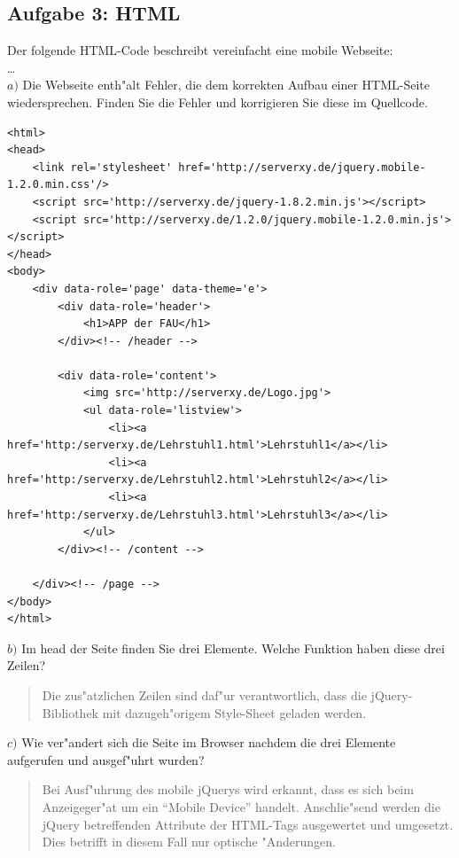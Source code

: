 \subsection{Aufgabe 3: HTML}
Der folgende HTML-Code beschreibt vereinfacht eine mobile Webseite:\\
\ldots\\

\noindent
$a)$ Die Webseite enth"alt Fehler, die dem korrekten Aufbau einer HTML-Seite wiedersprechen.
Finden Sie die Fehler und korrigieren Sie diese im Quellcode.

\lstset{style=customXML}
\begin{lstlisting}
<html>
<head>
    <link rel='stylesheet' href='http://serverxy.de/jquery.mobile-1.2.0.min.css'/>
    <script src='http://serverxy.de/jquery-1.8.2.min.js'></script>
    <script src='http://serverxy.de/1.2.0/jquery.mobile-1.2.0.min.js'></script>
</head>
<body>
    <div data-role='page' data-theme='e'>
        <div data-role='header'>
            <h1>APP der FAU</h1>
        </div><!-- /header -->

        <div data-role='content'>
            <img src='http://serverxy.de/Logo.jpg'>
            <ul data-role='listview'>
                <li><a href='http:/serverxy.de/Lehrstuhl1.html'>Lehrstuhl1</a></li>
                <li><a href='http:/serverxy.de/Lehrstuhl2.html'>Lehrstuhl2</a></li>
                <li><a href='http:/serverxy.de/Lehrstuhl3.html'>Lehrstuhl3</a></li>
            </ul>
        </div><!-- /content -->

    </div><!-- /page -->
</body>
</html>
\end{lstlisting}
\bigskip

\noindent
$b)$ Im head der Seite finden Sie drei Elemente.
Welche Funktion haben diese drei Zeilen?\\
\begin{quote}
    Die zus"atzlichen Zeilen sind daf"ur verantwortlich, dass die jQuery-Bibliothek mit dazugeh"origem Style-Sheet geladen werden.
\end{quote}
\bigskip

\noindent
$c)$ Wie ver"andert sich die Seite im Browser nachdem die drei Elemente aufgerufen und ausgef"uhrt wurden?\\
\begin{quote}
    Bei Ausf"uhrung des mobile jQuerys wird erkannt, dass es sich beim Anzeigeger"at um ein "`Mobile Device"' handelt.
    Anschlie"send werden die jQuery betreffenden Attribute der HTML-Tags ausgewertet und umgesetzt.
    Dies betrifft in diesem Fall nur optische "Anderungen.
\end{quote}







